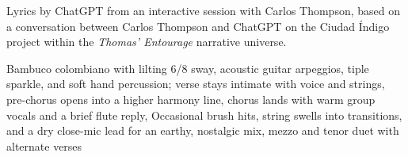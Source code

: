 
\begin{notes}
Lyrics by ChatGPT from an interactive session with Carlos Thompson, %
based on a conversation between Carlos Thompson and ChatGPT on the Ciudad Índigo project %
within the \emph{Thomas’ Entourage} narrative universe.
\end{notes}
\begin{style}
Bambuco colombiano with lilting 6/8 sway, acoustic guitar arpeggios, tiple sparkle, and soft hand percussion; verse stays intimate with voice and strings, pre-chorus opens into a higher harmony line, chorus lands with warm group vocals and a brief flute reply, Occasional brush hits, string swells into transitions, and a dry close-mic lead for an earthy, nostalgic mix, mezzo and tenor duet with alternate verses
\end{style}
